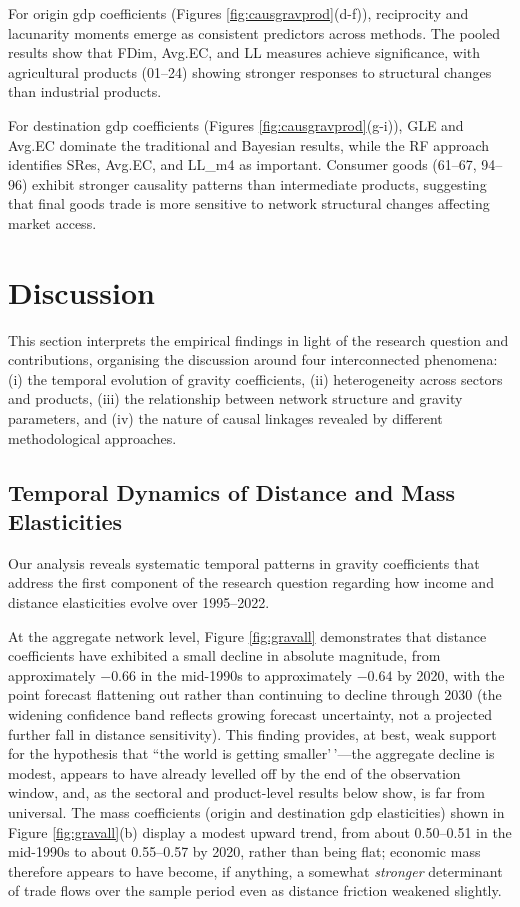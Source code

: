 \documentclass[preprint, 3p,
authoryear]{elsarticle} %
\begin{document}
For origin \gls{gdp} coefficients (Figures \ref{fig:causgravprod}(d-f)),
reciprocity and lacunarity moments emerge as consistent predictors
across methods. The pooled results show that FDim, Avg.EC, and LL
measures achieve significance, with agricultural products (01--24)
showing stronger responses to structural changes than industrial
products.

For destination \gls{gdp} coefficients (Figures
\ref{fig:causgravprod}(g-i)), GLE and Avg.EC dominate the traditional
and Bayesian results, while the RF approach identifies SRes, Avg.EC, and
LL\_m4 as important. Consumer goods (61--67, 94--96) exhibit stronger
causality patterns than intermediate products, suggesting that final
goods trade is more sensitive to network structural changes affecting
market access.

\section{Discussion}\label{sec:discussion}

This section interprets the empirical findings in light of the research
question and contributions, organising the discussion around four
interconnected phenomena: (i) the temporal evolution of gravity
coefficients, (ii) heterogeneity across sectors and products, (iii) the
relationship between network structure and gravity parameters, and (iv)
the nature of causal linkages revealed by different methodological
approaches.

\subsection{Temporal Dynamics of Distance and Mass
Elasticities}\label{subsec:temporal_dynamics}

Our analysis reveals systematic temporal patterns in gravity
coefficients that address the first component of the research question
regarding how income and distance elasticities evolve over 1995--2022.

At the aggregate network level, Figure \ref{fig:gravall} demonstrates
that distance coefficients have exhibited a small decline in absolute
magnitude, from approximately \(-0.66\) in the mid-1990s to
approximately \(-0.64\) by 2020, with the point forecast flattening out
rather than continuing to decline through 2030 (the widening confidence
band reflects growing forecast uncertainty, not a projected further fall
in distance sensitivity). This finding provides, at best, weak support
for the hypothesis that ``the world is getting smaller'\,'---the
aggregate decline is modest, appears to have already levelled off by the
end of the observation window, and, as the sectoral and product-level
results below show, is far from universal. The mass coefficients (origin
and destination \gls{gdp} elasticities) shown in Figure
\ref{fig:gravall}(b) display a modest upward trend, from about
0.50--0.51 in the mid-1990s to about 0.55--0.57 by 2020, rather than
being flat; economic mass therefore appears to have become, if anything,
a somewhat \emph{stronger} determinant of trade flows over the sample
period even as distance friction weakened slightly.
\end{document}
